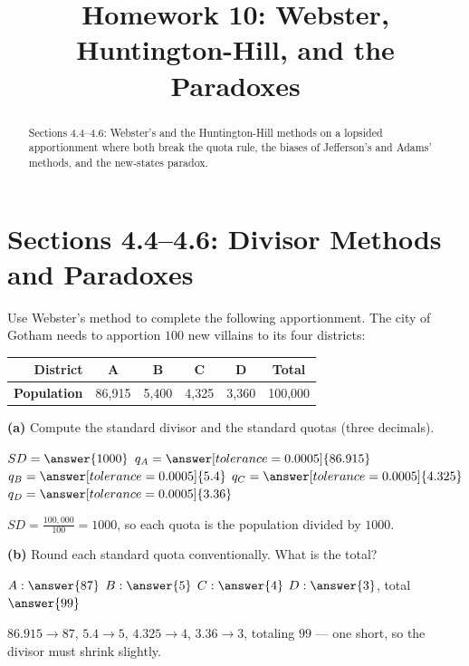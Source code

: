 \documentclass[12pt]{ximera}
\title{Homework 10: Webster, Huntington-Hill, and the Paradoxes}
\begin{document}
\begin{abstract}
Sections 4.4--4.6: Webster's and the Huntington-Hill methods on a lopsided
apportionment where both break the quota rule, the biases of Jefferson's and Adams'
methods, and the new-states paradox.
\end{abstract}
\maketitle

\section*{Sections 4.4--4.6: Divisor Methods and Paradoxes}

\begin{problem}
Use Webster's method to complete the following apportionment. The city of Gotham needs
to apportion $100$ new villains to its four districts:
\begin{center}
\begin{tabular}{|r|c|c|c|c|c|}\hline
\textbf{District} & A & B & C & D & \textbf{Total}\\\hline
\textbf{Population} & 86{,}915 & 5{,}400 & 4{,}325 & 3{,}360 & 100{,}000\\\hline
\end{tabular}
\end{center}

\begin{prompt}
\textbf{(a)} Compute the standard divisor and the standard quotas (three decimals).

$SD=\answer{1000}$ \qquad $q_A=\answer[tolerance=0.0005]{86.915}$ \quad
$q_B=\answer[tolerance=0.0005]{5.4}$ \quad $q_C=\answer[tolerance=0.0005]{4.325}$ \quad
$q_D=\answer[tolerance=0.0005]{3.36}$

\begin{feedback}
$SD=\frac{100{,}000}{100}=1000$, so each quota is the population divided by $1000$.
\end{feedback}
\end{prompt}

\begin{prompt}
\textbf{(b)} Round each standard quota conventionally. What is the total?

$A:\answer{87}$ \quad $B:\answer{5}$ \quad $C:\answer{4}$ \quad $D:\answer{3}$, \quad
total $\answer{99}$

\begin{feedback}
$86.915\to 87$, $5.4\to 5$, $4.325\to 4$, $3.36\to 3$, totaling $99$ --- one short, so
the divisor must shrink slightly.
\end{feedback}
\end{prompt}


\end{problem}
\end{document}
